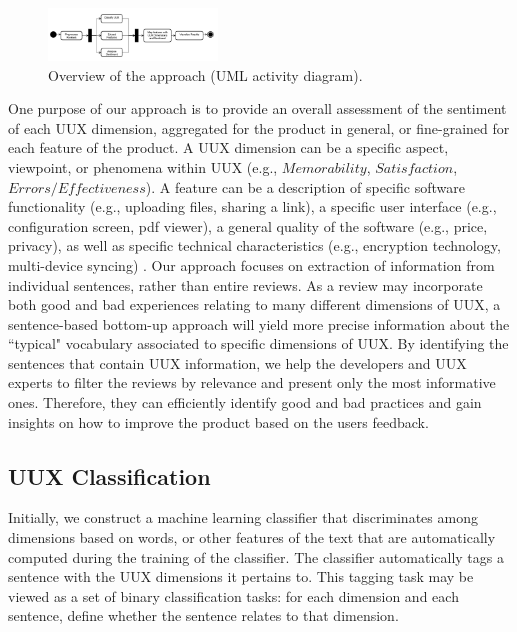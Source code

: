 		\begin{figure}[ht]
		\centering
  			\includegraphics[width=0.4\textwidth]{img/introduction_acitvitydiagram_overallapproach.pdf}
			\caption{Overview of the approach (UML activity diagram).}
			\label{fig:introduction_high_level_overall_approach_overview}
		\end{figure}

One purpose of our approach is to provide an overall assessment of the sentiment of each UUX dimension, aggregated for the product in general, or fine-grained for each feature of the product. 
A UUX dimension can be a specific aspect, viewpoint, or phenomena within UUX (e.g., $Memorability$, $Satisfaction$, $Errors/Effectiveness$). A feature can be a description of specific software functionality (e.g., uploading files, sharing a link), a specific user interface (e.g., configuration screen, pdf viewer), a general quality of the software (e.g., price, privacy), as well as specific technical characteristics (e.g., encryption technology, multi-device syncing) \cite{Guzman2015}.
Our approach focuses on extraction of information from individual sentences, rather than entire reviews. As a review may incorporate both good and bad experiences relating to many different dimensions of UUX, a sentence-based bottom-up approach will yield more precise information about the ``typical" vocabulary associated to specific dimensions of UUX. By identifying the sentences that contain UUX information, we help the developers and UUX experts to filter the reviews by relevance and present only the most informative ones. 
Therefore, they can efficiently identify good and bad practices and gain insights on how to improve the product based on the users feedback.

\subsection{UUX Classification}

Initially, we construct a machine learning classifier that discriminates among dimensions based on words, or other features of the text that are automatically computed during the training of the classifier. The classifier automatically tags a sentence with the UUX dimensions it pertains to. This tagging task may be viewed as a set of binary classification tasks: for each dimension and each sentence, define whether the sentence relates to that dimension. 

